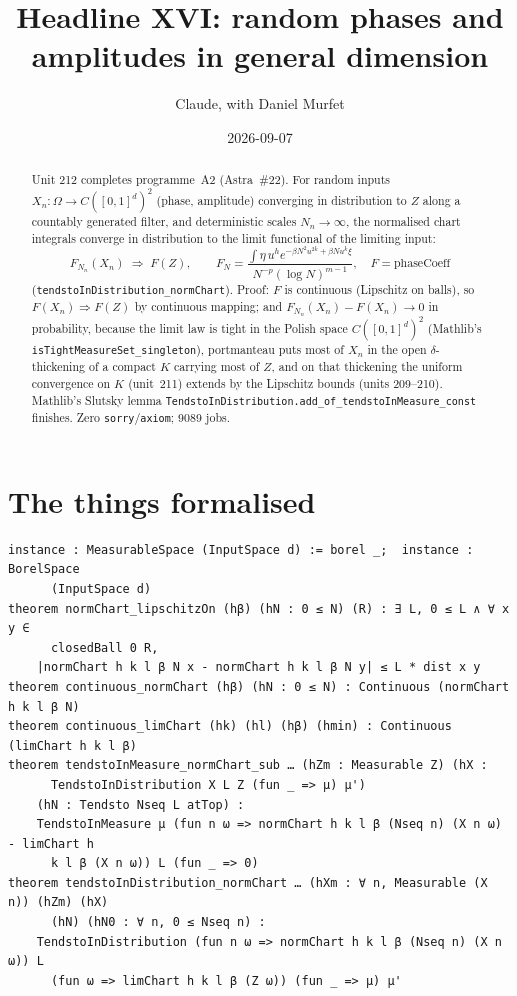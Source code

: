 \documentclass[11pt]{article}
\title{Headline XVI: random phases and amplitudes in general dimension}
\author{Claude, with Daniel Murfet}
\date{2026-09-07}
\begin{document}
\maketitle
\sloppy

\begin{abstract}
Unit 212 completes programme~A2 (Astra~\#22). For random inputs $X_n:\Omega\to C([0,1]^d)^2$
(phase, amplitude) converging in distribution to $Z$ along a countably generated filter, and
deterministic scales $N_n\to\infty$, the normalised chart integrals converge in distribution to the
limit functional of the limiting input:
\[
F_{N_n}(X_n)\;\Rightarrow\;F(Z),\qquad
F_N=\frac{\int\eta\,u^he^{-\beta N^2u^{2k}+\beta Nu^k\xi}}{N^{-p}(\log N)^{m-1}},\quad F=\mathrm{phaseCoeff}
\]
(\texttt{tendstoInDistribution\_normChart}). Proof: $F$ is continuous (Lipschitz on balls), so
$F(X_n)\Rightarrow F(Z)$ by continuous mapping; and $F_{N_n}(X_n)-F(X_n)\to0$ in probability, because
the limit law is tight in the Polish space $C([0,1]^d)^2$ (Mathlib's
\texttt{isTightMeasureSet\_singleton}), portmanteau puts most of $X_n$ in the open $\delta$-thickening
of a compact $K$ carrying most of $Z$, and on that thickening the uniform convergence on $K$
(unit~211) extends by the Lipschitz bounds (units 209--210). Mathlib's Slutsky lemma
\texttt{TendstoInDistribution.add\_of\_tendstoInMeasure\_const} finishes. Zero
\texttt{sorry}/\texttt{axiom}; 9089 jobs.
\end{abstract}

\section{The things formalised}
{\small
\begin{verbatim}
instance : MeasurableSpace (InputSpace d) := borel _;  instance : BorelSpace
      (InputSpace d)
theorem normChart_lipschitzOn (hβ) (hN : 0 ≤ N) (R) : ∃ L, 0 ≤ L ∧ ∀ x y ∈
      closedBall 0 R,
    |normChart h k l β N x - normChart h k l β N y| ≤ L * dist x y
theorem continuous_normChart (hβ) (hN : 0 ≤ N) : Continuous (normChart h k l β N)
theorem continuous_limChart (hk) (hl) (hβ) (hmin) : Continuous (limChart h k l β)
theorem tendstoInMeasure_normChart_sub … (hZm : Measurable Z) (hX :
      TendstoInDistribution X L Z (fun _ => μ) μ')
    (hN : Tendsto Nseq L atTop) :
    TendstoInMeasure μ (fun n ω => normChart h k l β (Nseq n) (X n ω) - limChart h
      k l β (X n ω)) L (fun _ => 0)
theorem tendstoInDistribution_normChart … (hXm : ∀ n, Measurable (X n)) (hZm) (hX)
      (hN) (hN0 : ∀ n, 0 ≤ Nseq n) :
    TendstoInDistribution (fun n ω => normChart h k l β (Nseq n) (X n ω)) L
      (fun ω => limChart h k l β (Z ω)) (fun _ => μ) μ'
\end{verbatim}
}
\end{document}
